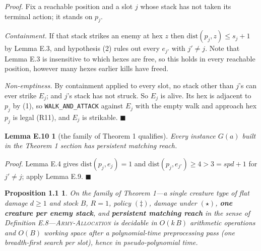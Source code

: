 \documentclass[11pt,a4paper]{article}
\theoremstyle{plain}
\newtheorem*{propdp}{Proposition 1.1}
\newtheorem*{lemEfam}{Lemma E.10}
\theoremstyle{definition}
\theoremstyle{plain}
\theoremstyle{definition}
\theoremstyle{remark}
\newcommand{\ALLOC}{\textsc{Army-Allocation}}
\newcommand{\qedbox}{\hfill$\blacksquare$}
\begin{document}
\noindent\emph{Proof.} Fix a reachable position and a slot $j$ whose stack has not taken its
terminal action; it stands on $p_j$.

\emph{Containment.} If that stack strikes an enemy at hex $z$ then $\mathrm{dist}(p_j,z)\le
s_j+1$ by Lemma E.3, and hypothesis (2) rules out every $e_{j'}$ with $j'\ne j$. Note that
Lemma E.3 is insensitive to which hexes are free, so this holds in every reachable position,
however many hexes earlier kills have freed.

\emph{Non-emptiness.} By containment applied to every slot, no stack other than $j$'s can
ever strike $E_j$; and $j$'s stack has not struck. So $E_j$ is alive. Its hex is adjacent to
$p_j$ by (1), so \texttt{WALK\_AND\_ATTACK} against $E_j$ with the empty walk and approach
hex $p_j$ is legal (R11), and $E_j$ is strikable. \qedbox

\begin{lemEfam}[the family of Theorem 1 qualifies]
Every instance $G(a)$ built in the Theorem 1 section has persistent matching reach.
\end{lemEfam}

\noindent\emph{Proof.} Lemma E.4 gives $\mathrm{dist}(p_j,e_j)=1$ and
$\mathrm{dist}(p_j,e_{j'})\ge 4>3=\mathit{spd}+1$ for $j'\ne j$; apply Lemma E.9. \qedbox

\begin{propdp}
On the family of Theorem 1---a single creature type of flat damage $d\ge 1$ and stock $B$,
$R=1$, policy $(\ddagger)$, damage under $(\star)$, \textbf{one creature per enemy stack},
and \textbf{persistent matching reach} in the sense of Definition E.8---\ALLOC{} is decidable
in $O(k\,B)$ arithmetic operations and $O(B)$ working space after a polynomial-time
preprocessing pass (one breadth-first search per slot), hence in pseudo-polynomial time.
\end{propdp}
\end{document}
